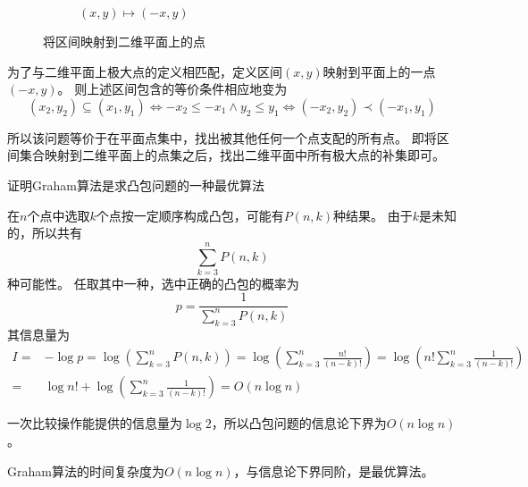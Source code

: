 \documentclass[answers]{exam}
\begin{document}
\begin{questions}
\begin{solution}
\begin{figure}[H]
\begin{subfigure}[b]{0.45\textwidth}
                \caption{$(x,y) \longmapsto (-x,y)$}
            \end{subfigure}
            \caption{将区间映射到二维平面上的点}
        \end{figure}

        为了与二维平面上极大点的定义相匹配，定义区间$(x,y)$映射到平面上的一点$(-x,y)$。
        则上述区间包含的等价条件相应地变为
        \[
            (x_2, y_2) \subseteq (x_1, y_1)
            \Longleftrightarrow -x_2 \le -x_1  \wedge y_2 \le y_1
            \Longleftrightarrow (-x_2, y_2) \prec (-x_1, y_1)
        \]

        所以该问题等价于在平面点集中，找出被其他任何一个点支配的所有点。
        即将区间集合映射到二维平面上的点集之后，找出二维平面中所有极大点的补集即可。

    \end{solution}

    \question  证明Graham算法是求凸包问题的一种最优算法

    \begin{solution}
        在$n$个点中选取$k$个点按一定顺序构成凸包，可能有$P(n, k)$种结果。
        由于$k$是未知的，所以共有\[
            \sum_{k = 3}^{n} P(n,k)
        \]种可能性。
        任取其中一种，选中正确的凸包的概率为\[
            p = \frac{1}{\sum_{k = 3}^{n} P(n,k)}
        \]
        其信息量为
        \begin{align*}
            I = & - \log p = \log \left( \sum_{k = 3}^{n} P(n,k) \right)
            = \log \left( \sum_{k = 3}^{n} \frac{n!}{(n-k)!} \right)
            =  \log \left( n! \sum_{k = 3}^{n} \frac{1}{(n-k)!} \right)          \\
            =   & \log n! + \log \left(\sum_{k = 3}^{n} \frac{1}{(n-k)!} \right)
            =  O(n \log n)
        \end{align*}

        一次比较操作能提供的信息量为$\log 2$，所以凸包问题的信息论下界为$O(n \log n)$。

        Graham算法的时间复杂度为$O(n\log n)$，与信息论下界同阶，是最优算法。


\end{solution}
\end{questions}
\end{document}
